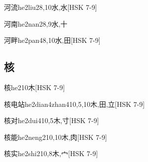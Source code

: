 \begin{EntryWithPhonetic}{河流}{he2liu2}{8,10}{⽔,⽔}[HSK 7-9]
\end{EntryWithPhonetic}

\begin{EntryWithPhonetic}{河南}{he2nan2}{8,9}{⽔,⼗}
\end{EntryWithPhonetic}

\begin{EntryWithPhonetic}{河畔}{he2pan4}{8,10}{⽔,⽥}[HSK 7-9]
\end{EntryWithPhonetic}

\subsection*{核}

\begin{EntryWithPhonetic}{核}{he2}{10}{⽊}[HSK 7-9]
\end{EntryWithPhonetic}

\begin{EntryWithPhonetic}{核电站}{he2dian4zhan4}{10,5,10}{⽊,⽥,⽴}[HSK 7-9]
\end{EntryWithPhonetic}

\begin{EntryWithPhonetic}{核对}{he2dui4}{10,5}{⽊,⼨}[HSK 7-9]
\end{EntryWithPhonetic}

\begin{EntryWithPhonetic}{核能}{he2neng2}{10,10}{⽊,⾁}[HSK 7-9]
\end{EntryWithPhonetic}

\begin{EntryWithPhonetic}{核实}{he2shi2}{10,8}{⽊,⼧}[HSK 7-9]
\end{EntryWithPhonetic}

